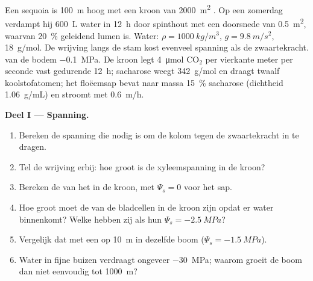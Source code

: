 \begin{problem}
\label{pb:b1:plant-transport:1}
Een sequoia is \qty{100}{m} hoog met een kroon van \qty{2000}{m^2} . Op
een zomerdag verdampt hij \qty{600}{L} water in \qty{12}{h} door spinthout
met een doorsnede van \qty{0.5}{m^2}, waarvan \qty{20}{\%} geleidend lumen
is. Water: $\rho = \qty{1000}{kg/m^3}$, $g =
\qty{9.8}{m/s^2}$, \qty{18}{g/mol}. De wrijving langs de stam kost evenveel
spanning als de zwaartekracht.  van de bodem
\qty{-0.1}{MPa}. De kroon legt \qty{4}{\micro mol} $\mathrm{CO_2}$ per
vierkante meter  per seconde vast gedurende \qty{12}{h}; sacharose weegt
\qty{342}{g/mol} en draagt twaalf koolstofatomen; het floëemsap bevat naar
massa \qty{15}{\%} sacharose (dichtheid \qty{1.06}{g/mL}) en stroomt met
\qty{0.6}{m/h}.

\medskip
\noindent\textbf{Deel I --- Spanning.}
\begin{enumerate}
  \item Bereken de spanning die nodig is om de kolom tegen de
        zwaartekracht in te dragen.
  \item Tel de wrijving erbij: hoe groot is de xyleemspanning in de
        kroon?
  \item Bereken de  van het  in de kroon, met
        $\Psi_s = 0$ voor het sap.
  \item Hoe groot moet de  van de bladcellen in de kroon
        zijn opdat er water binnenkomt? Welke  hebben zij als hun
        $\Psi_s = \qty{-2.5}{MPa}$?
  \item Vergelijk dat met een  op \qty{10}{m} in dezelfde boom ($\Psi_s =
        \qty{-1.5}{MPa}$).
  \item Water in fijne buizen verdraagt ongeveer \qty{-30}{MPa}; waarom
        groeit de boom dan niet eenvoudig tot \qty{1000}{m}?
\end{enumerate}


\end{problem}

